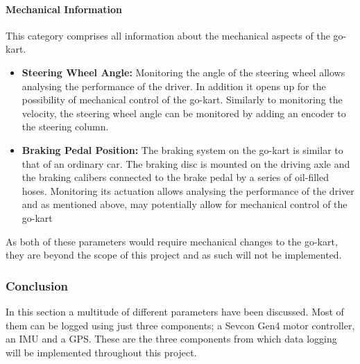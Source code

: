 \paragraph*{Mechanical Information}
This category comprises all information about the mechanical aspects of the go-kart.
\begin{itemize}
	\item \textbf{Steering Wheel Angle:} Monitoring the angle of the steering wheel allows analysing the performance of the driver.
	In addition it opens up for the possibility of mechanical control of the go-kart.
	Similarly to monitoring the velocity, the steering wheel angle can be monitored by adding an encoder to the steering column.
	\item \textbf{Braking Pedal Position:} The braking system on the go-kart is similar to that of an ordinary car.
	The braking disc is mounted on the driving axle and the braking calibers connected to the brake pedal by a series of oil-filled hoses.
	Monitoring its actuation allows analysing the performance of the driver and as mentioned above, may potentially allow for mechanical control of the go-kart
\end{itemize}
As both of these parameters would require mechanical changes to the go-kart, they are beyond the scope of this project and as such will not be implemented.
\subsubsection*{Conclusion}
In this section a multitude of different parameters have been discussed.
Most of them can be logged using just three components; a Sevcon Gen4 motor controller, an IMU and a GPS.
These are the three components from which data logging will be implemented throughout this project.



